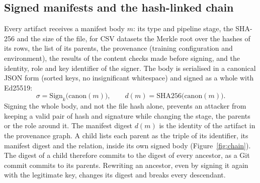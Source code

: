 \subsection{Signed manifests and the hash-linked chain}
Every artifact receives a manifest body $m$: its type and pipeline stage, the SHA-256 and the size of the file,
for CSV datasets the Merkle root over the hashes of its rows, the list of its parents, the provenance (training
configuration and environment), the results of the content checks made before signing, and the identity, role
and key identifier of the signer. The body is serialised in a canonical JSON form (sorted keys, no
insignificant whitespace) and signed as a whole with Ed25519:
\begin{equation}
\sigma = \mathrm{Sign}_{k}\bigl(\mathrm{canon}(m)\bigr),\qquad
d(m) = \mathrm{SHA256}\bigl(\mathrm{canon}(m)\bigr).
\label{eq:sign}
\end{equation}
Signing the whole body, and not the file hash alone, prevents an attacker from keeping a valid pair of hash
and signature while changing the stage, the parents or the role around it. The manifest digest $d(m)$ is the
identity of the artifact in the provenance graph. A child lists each parent as the triple of its identifier,
its manifest digest and the relation, inside its own signed body (Figure~\ref{fig:chain}). The digest of a
child therefore commits to the digest of every ancestor, as a Git commit commits to its parents. Rewriting an
ancestor, even by signing it again with the legitimate key, changes its digest and breaks every descendant.

